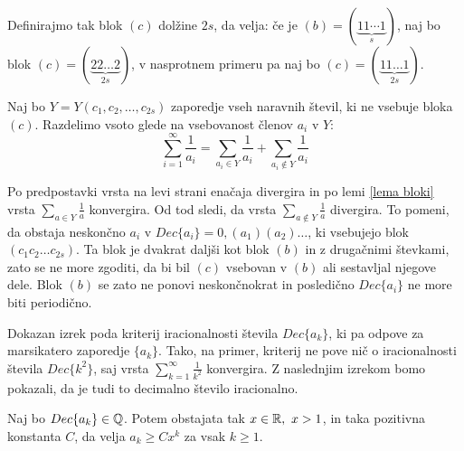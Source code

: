 \documentclass[twoside,11pt]{article}
\begin{document}
Definirajmo tak blok $(c)$ dolžine $2s$, da velja: 
če je $(b) = (\underbrace{11 \cdots 1}_{s})$, naj bo blok $(c) = (\underbrace{22\dots 2}_{2s})$, 
v nasprotnem primeru pa naj bo $(c) = (\underbrace{11\dots 1}_{2s})$.

Naj bo $Y = Y(c_1, c_2, \dots, c_{2s})$ zaporedje vseh naravnih števil, 
ki ne vsebuje bloka $(c)$.
Razdelimo vsoto glede na vsebovanost členov $a_i$ v $Y$:
\[
    \sum_{i=1}^{\infty} \frac{1}{a_i} = \sum_{a_i \in Y}\frac{1}{a_i} + \sum_{a_i \notin Y} \frac{1}{a_i}
    \]

Po predpostavki vrsta na levi strani enačaja divergira in po lemi \ref{lema bloki} vrsta $\sum_{a \in Y}\frac{1}{a}$
konvergira. Od tod sledi, da vrsta $\sum_{a \notin Y} \frac{1}{a}$ divergira.
To pomeni, da obstaja neskončno $a_i$ v $Dec\{a_i\} = 0,(a_1)(a_2) \dots$, ki vsebujejo blok 
$(c_1c_2\dots c_{2s})$. Ta blok je dvakrat daljši kot blok $(b)$ in z drugačnimi števkami, zato se ne more
zgoditi, da bi bil $(c)$ vsebovan v $(b)$ ali sestavljal njegove dele. 
Blok $(b)$ se zato ne ponovi neskončnokrat in posledično $Dec\{a_i\}$ ne more biti periodično.

\QED


Dokazan izrek poda kriterij iracionalnosti števila $Dec\{a_k\}$,
ki pa odpove za marsikatero zaporedje $\{a_k\}$.
Tako, na primer, kriterij ne pove nič o iracionalnosti števila $Dec\{k^2\}$, saj vrsta $\sum_{k=1}^{\infty}\frac{1}{k^2}$ konvergira.
Z naslednjim izrekom bomo pokazali, da je tudi to decimalno število iracionalno.

%
%


\begin{izrek}
    \label{izrek1clanek2}
    Naj bo $Dec\{a_k\} \in \mathbb{Q}$. Potem obstajata tak $x \in \mathbb{R}, \ x > 1$, in taka pozitivna konstanta $C$,
    da velja $a_k \geq Cx^k$ za vsak $k \geq 1$.
\end{izrek}
\end{document}

